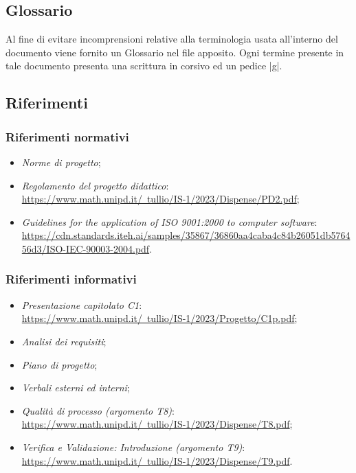\subsection{Glossario}
Al fine di evitare incomprensioni relative alla terminologia usata all’interno del documento viene fornito un Glossario nel file apposito. Ogni termine presente in tale documento presenta una scrittura in corsivo ed un pedice |g|.

\subsection{Riferimenti}
   \subsubsection{Riferimenti normativi}
   \begin{itemize}
    \item \textit{Norme di progetto};
    \item \textit{Regolamento del progetto didattico}: \\
    \href{https://www.math.unipd.it/~tullio/IS-1/2023/Dispense/PD2.pdf}{https://www.math.unipd.it/~tullio/IS-1/2023/Dispense/PD2.pdf};
    \item \textit{Guidelines for
    the application of ISO 9001:2000 to
    computer software}: \\
    \href{https://cdn.standards.iteh.ai/samples/35867/36860aa4caba4c84b26051db576456d3/ISO-IEC-90003-2004.pdf}{https://cdn.standards.iteh.ai/samples/35867/36860aa4caba4c84b26051db576456d3/ISO-IEC-90003-2004.pdf}.
    \end{itemize}
    
    \subsubsection{Riferimenti informativi}
    \begin{itemize}
    \item \textit{Presentazione capitolato C1}: \\
    \href{https://www.math.unipd.it/~tullio/IS-1/2023/Progetto/C1p.pdf}{https://www.math.unipd.it/~tullio/IS-1/2023/Progetto/C1p.pdf};
    \item \textit{Analisi dei requisiti};
    \item \textit{Piano di progetto};
    \item \textit{Verbali esterni ed interni};
    \item \textit{Qualità di processo (argomento T8)}: \\
    \href{https://www.math.unipd.it/~tullio/IS-1/2023/Dispense/T8.pdf}{https://www.math.unipd.it/~tullio/IS-1/2023/Dispense/T8.pdf};
    \item \textit{Verifica e Validazione: Introduzione (argomento T9)}: \\
    \href{https://www.math.unipd.it/~tullio/IS-1/2023/Dispense/T9.pdf}{https://www.math.unipd.it/~tullio/IS-1/2023/Dispense/T9.pdf}.
    
   
    \end{itemize}

